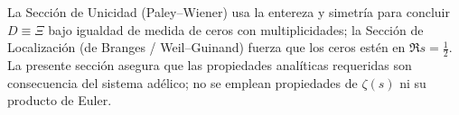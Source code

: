 \begin{remark}
La Sección de Unicidad (Paley–Wiener) usa la entereza y simetría para concluir $D\equiv \Xi$
bajo igualdad de medida de ceros con multiplicidades; la Sección de Localización (de Branges / Weil–Guinand)
fuerza que los ceros estén en $\Re s=\tfrac12$. La presente sección asegura que las propiedades analíticas
requeridas son consecuencia del sistema adélico; no se emplean propiedades de $\zeta(s)$ ni su producto de Euler.
\end{remark}